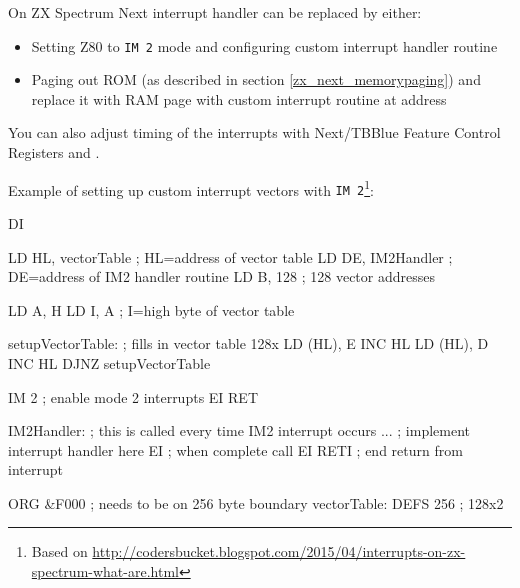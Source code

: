On ZX Spectrum Next interrupt handler can be replaced by either:

\begin{itemize}
	\item Setting Z80 to {\tt IM 2} mode and configuring custom interrupt handler routine
	
	\item Paging out ROM (as described in section \ref{zx_next_memorypaging}) and replace it with RAM page with custom interrupt routine at address 
\end{itemize}

You can also adjust timing of the interrupts with Next/TBBlue Feature Control Registers  and .

\pagebreak	%

Example of setting up custom interrupt vectors with {\tt IM 2}\footnote{Based on {\url{http://codersbucket.blogspot.com/2015/04/interrupts-on-zx-spectrum-what-are.html}}}:

\begin{tcblisting}{}
	DI
	
	LD HL, vectorTable    ; HL=address of vector table
	LD DE, IM2Handler     ; DE=address of IM2 handler routine
	LD B, 128             ; 128 vector addresses

	LD A, H
	LD I, A               ; I=high byte of vector table

setupVectorTable:         ; fills in vector table 128x
	LD (HL), E
	INC HL
	LD (HL), D
	INC HL
	DJNZ setupVectorTable 

	IM 2                  ; enable mode 2 interrupts
	EI
	RET

IM2Handler:               ; this is called every time IM2 interrupt occurs
	...                   ; implement interrupt handler here
	EI                    ; when complete call EI
	RETI                  ; end return from interrupt

	ORG &F000             ; needs to be on 256 byte boundary
vectorTable:
	DEFS 256              ; 128x2
\end{tcblisting}



\pagebreak
